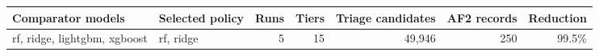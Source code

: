\begin{tabular}{llrrrrr}
\toprule
Comparator models & Selected policy & Runs & Tiers & Triage candidates & AF2 records & Reduction \\
\midrule
rf, ridge, lightgbm, xgboost & rf, ridge & 5 & 15 & 49,946 & 250 & 99.5\% \\
\bottomrule
\end{tabular}

